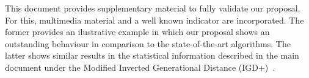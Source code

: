 This document provides supplementary material to fully validate our proposal.
%
For this, multimedia material and a well known indicator are incorporated.
%
The former provides an ilustrative example in which our proposal shows an outstanding behaviour in comparison to the state-of-the-art algorithms.
%
The latter shows similar results in the statistical information described in the main document under the Modified Inverted Generational Distance (IGD+)~\cite{Joel:Inverted_Generational_Distance_Plus}.
%
%
%
